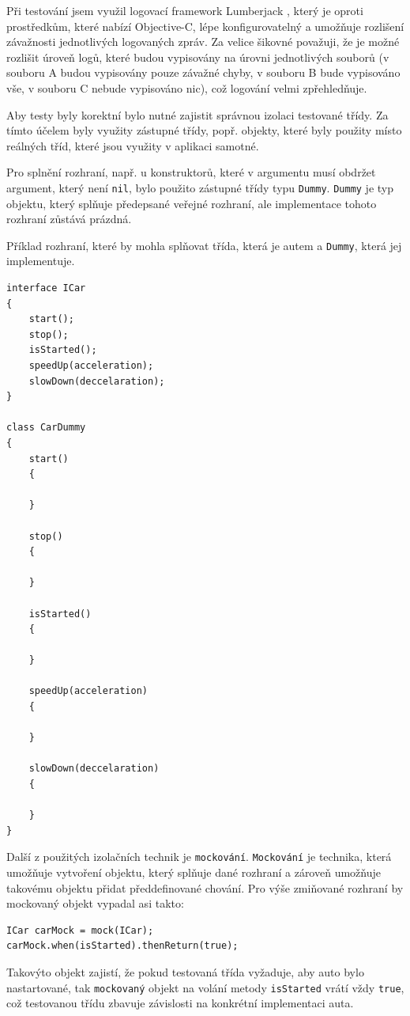 \documentclass[thesis=B,czech]{FITthesis}[2012/06/26]
\begin{document}
	Při testování jsem využil logovací framework Lumberjack \cite{lumberjackOnline}, který je oproti prostředkům, které nabízí Objective-C, lépe konfigurovatelný a umožňuje rozlišení závažnosti jednotlivých logovaných zpráv. Za velice šikovné považuji, že je možné rozlišit úroveň logů, které budou vypisovány na úrovni jednotlivých souborů (v souboru A budou vypisovány pouze závažné chyby, v souboru B bude vypisováno vše, v souboru C nebude vypisováno nic), což logování velmi zpřehledňuje.

	Aby testy byly korektní bylo nutné zajistit správnou izolaci testované třídy. Za tímto účelem byly využity zástupné třídy, popř. objekty, které byly použity místo reálných tříd, které jsou využity v aplikaci samotné.

	Pro splnění rozhraní, např. u konstruktorů, které v argumentu musí obdržet argument, který není \verb|nil|, bylo použito zástupné třídy typu \texttt{Dummy}. \texttt{Dummy} je typ objektu, který splňuje předepsané veřejné rozhraní, ale implementace tohoto rozhraní zůstává prázdná.

	Příklad rozhraní, které by mohla splňovat třída, která je autem a \texttt{Dummy}, která jej implementuje.
	\begin{lstlisting}
interface ICar
{
	start();
	stop();
	isStarted();
	speedUp(acceleration);
	slowDown(deccelaration);
}

class CarDummy
{
	start()
	{

	}

	stop()
	{

	}

	isStarted()
	{

	}

	speedUp(acceleration)
	{

	}

	slowDown(deccelaration)
	{

	}
}
	\end{lstlisting}

	Další z použitých izolačních technik je \texttt{mockování}. \texttt{Mockování} je technika, která umožňuje vytvoření objektu, který splňuje dané rozhraní a zároveň umožňuje takovému objektu přidat předdefinované chování. Pro výše zmiňované rozhraní by mockovaný objekt vypadal asi takto:
	\begin{lstlisting}
ICar carMock = mock(ICar);
carMock.when(isStarted).thenReturn(true);
	\end{lstlisting}
	Takovýto objekt zajistí, že pokud testovaná třída vyžaduje, aby auto bylo nastartované, tak \texttt{mockovaný} objekt na volání metody \verb|isStarted| vrátí vždy \verb|true|, což testovanou třídu zbavuje závislosti na konkrétní implementaci auta.
\end{document}
